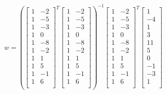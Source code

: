 \documentclass[12pt]{article}
\begin{document}
\begin{enumerate}
\begin{enumerate}
	\begin{equation}
	\begin{split}
		w = (\begin{bmatrix}
			1 & -2\\
			1 & -5\\	
			1 & -3\\
			1 & 0\\
			1 & -8\\
			1 & -2\\
			1 & 1\\
			1 & 5\\
			1 & -1\\
			1 & 6\\
		\end{bmatrix}^{T}\begin{bmatrix}
			1 & -2\\
			1 & -5\\	
			1 & -3\\
			1 & 0\\
			1 & -8\\
			1 & -2\\
			1 & 1\\
			1 & 5\\
			1 & -1\\
			1 & 6\\
		\end{bmatrix})^{-1}\begin{bmatrix}
			1 & -2\\
			1 & -5\\	
			1 & -3\\
			1 & 0\\
			1 & -8\\
			1 & -2\\
			1 & 1\\
			1 & 5\\
			1 & -1\\
			1 & 6\\
		\end{bmatrix}^{T}\begin{bmatrix}
			1\\
			-4\\	
			1\\
			3\\
			11\\
			5\\
			0\\
			-1\\
			-3\\
			1\\
			\end{bmatrix}
		\end{split}
	\end{equation}


\end{enumerate}
\end{enumerate}
\end{document}
